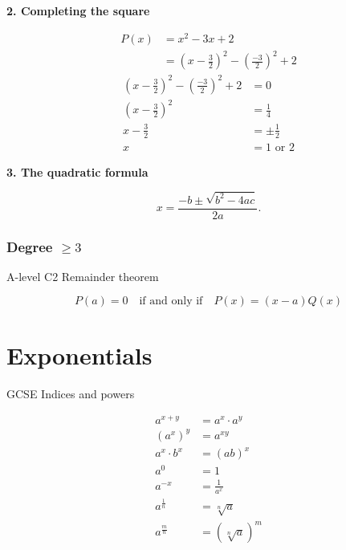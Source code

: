 \documentclass[11pt,a4paper,oneside]{book}
\begin{document}
\textbf{2. Completing the square}

\begin{example}
\begin{align*}
P(x)&=x^2-3x+2\\
&=\left(x-\tfrac{3}{2}\right)^2-\left(\tfrac{-3}{2}\right)^2+2
\end{align*}
\begin{align*}
\left(x-\tfrac{3}{2}\right)^2-\left(\tfrac{-3}{2}\right)^2+2&=0\\
\left(x-\tfrac{3}{2}\right)^2&=\tfrac{1}{4}\\
x-\tfrac{3}{2}&=\pm \tfrac{1}{2}\\
x&=1\text{ or }2
\end{align*}
\end{example}

\textbf{3. The quadratic formula}

\begin{equation*}
x=\frac{-b \pm \sqrt{b^2-4ac}}{2a}.
\end{equation*}

\subsubsection{Degree $\ge 3$}
\begin{gce}
A-level C2 Remainder theorem
\end{gce}
\begin{theorem}
$$P(a) = 0\quad \text{if and only if}\quad P(x)=(x-a)Q(x)$$
\end{theorem}

\section{Exponentials}
\begin{gce}
GCSE Indices and powers
\end{gce}
\begin{in_a_box}
\begin{align*}
a^{x+y}&=a^x\cdot a^y\\
\left( a^x \right)^y&=a^{xy}\\
a^x \cdot b^x &= \left( ab \right)^x\\
a^0&=1\\
a^{-x}&=\frac{1}{a^x}\\
a^\frac{1}{n} &= \sqrt[n]{a}\\
a^\frac{m}{n} &= \left(\sqrt[n]{a}\right)^m
\end{align*}
\end{in_a_box}
\end{document}
